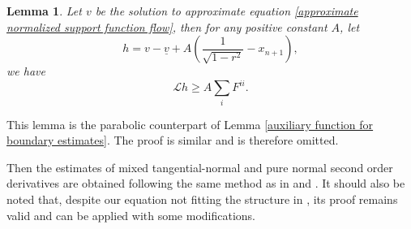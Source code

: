 \documentclass[reqno]{amsart}
\newtheorem{lemma}[theorem]{Lemma}
\theoremstyle{remark}
\theoremstyle{definition}
\numberwithin{equation}{section}
\begin{document}
\begin{lemma}\label{function h}
    Let $v$ be the solution to approximate equation \eqref{approximate normalized support function flow}, then for any positive constant $A$, let
    \[
    h = v - \underline{v} + A \left( \frac{1}{\sqrt{1-r^2}} - x_{n+1} \right),
    \]
    we have
    \[
    \mathscr{L} h \geqslant A \sum_i F^{ii}.
    \]
\end{lemma}
This lemma is the parabolic counterpart of Lemma \ref{auxiliary function for boundary estimates}. The proof is similar and is therefore omitted.

Then the estimates of mixed tangential-normal and pure normal second order derivatives are obtained following the same method as in \cite{Entiresigmakcurvatureflow} and \cite{Jiao}. It should also be noted that, despite our equation not fitting the structure in \cite{Jiao}, its proof remains valid and can be applied with some modifications.
\end{document}
